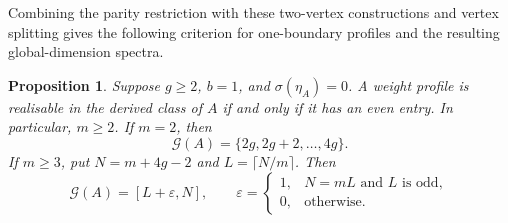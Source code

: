 \documentclass[11pt]{amsart}
\theoremstyle{definition}
\theoremstyle{plain}
\newtheorem{proposition}[proposition]{Proposition}
\theoremstyle{definition}
\theoremstyle{definition}
\newcommand{\GSpec}{\mathcal G}
\begin{document}
Combining the parity restriction with these two-vertex
constructions and vertex splitting gives the following
criterion for one-boundary profiles and the resulting
global-dimension spectra.


\begin{proposition}
\label{prop:classification-one-boundary}
Suppose $g\geq2$, $b=1$, and $\sigma(\eta_A)=0$.  A weight profile is
realisable in the derived class of $A$ if and only if it has an even
entry.  In particular, $m\geq2$.  If $m=2$, then
\begin{equation}
\label{eq:classification-gap-spectrum}
 \GSpec(A)=\{2g,2g+2,\ldots,4g\}.
\end{equation}
If $m\geq3$, put $N=m+4g-2$ and $L=\lceil N/m\rceil$.  Then
\begin{equation}
\label{eq:classification-one-boundary-interval}
 \GSpec(A)=[L+\varepsilon,N],\qquad
 \varepsilon=
 \begin{cases}
  1,&N=mL\text{ and }L\text{ is odd},\\
  0,&\text{otherwise}.
 \end{cases}
\end{equation}
\end{proposition}
\end{document}
